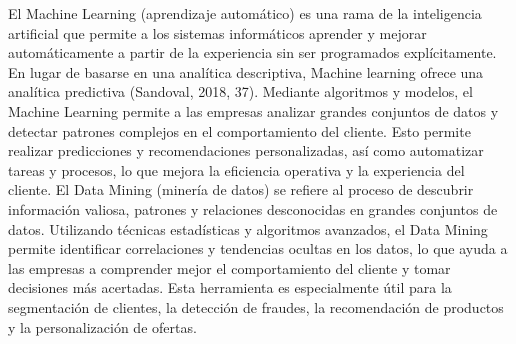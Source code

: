El Machine Learning (aprendizaje automático) es una rama de la inteligencia artificial que permite a los sistemas informáticos aprender y mejorar automáticamente a partir de la experiencia sin ser programados explícitamente. En lugar de basarse en una analítica descriptiva, Machine learning ofrece una analítica predictiva (Sandoval, 2018, 37). Mediante algoritmos y modelos, el Machine Learning permite a las empresas analizar grandes conjuntos de datos y detectar patrones complejos en el comportamiento del cliente. Esto permite realizar predicciones y recomendaciones personalizadas, así como automatizar tareas y procesos, lo que mejora la eficiencia operativa y la experiencia del cliente. El Data Mining (minería de datos) se refiere al proceso de descubrir información valiosa, patrones y relaciones desconocidas en grandes conjuntos de datos. Utilizando técnicas estadísticas y algoritmos avanzados, el Data Mining permite identificar correlaciones y tendencias ocultas en los datos, lo que ayuda a las empresas a comprender mejor el comportamiento del cliente y tomar decisiones más acertadas. Esta herramienta es especialmente útil para la segmentación de clientes, la detección de fraudes, la recomendación de productos y la personalización de ofertas.

